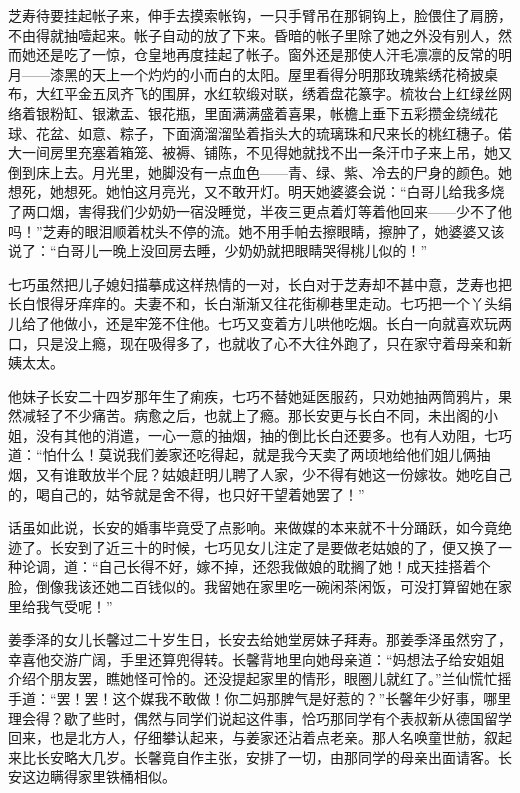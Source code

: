 \par 芝寿待要挂起帐子来，伸手去摸索帐钩，一只手臂吊在那铜钩上，脸偎住了肩膀，不由得就抽噎起来。帐子自动的放了下来。昏暗的帐子里除了她之外没有别人，然而她还是吃了一惊，仓皇地再度挂起了帐子。窗外还是那使人汗毛凛凛的反常的明月——漆黑的天上一个灼灼的小而白的太阳。屋里看得分明那玫瑰紫绣花椅披桌布，大红平金五凤齐飞的围屏，水红软缎对联，绣着盘花篆字。梳妆台上红绿丝网络着银粉缸、银漱盂、银花瓶，里面满满盛着喜果，帐檐上垂下五彩攒金绕绒花球、花盆、如意、粽子，下面滴溜溜坠着指头大的琉璃珠和尺来长的桃红穗子。偌大一间房里充塞着箱笼、被褥、铺陈，不见得她就找不出一条汗巾子来上吊，她又倒到床上去。月光里，她脚没有一点血色——青、绿、紫、冷去的尸身的颜色。她想死，她想死。她怕这月亮光，又不敢开灯。明天她婆婆会说：“白哥儿给我多烧了两口烟，害得我们少奶奶一宿没睡觉，半夜三更点着灯等着他回来——少不了他吗！”芝寿的眼泪顺着枕头不停的流。她不用手帕去擦眼睛，擦肿了，她婆婆又该说了：“白哥儿一晚上没回房去睡，少奶奶就把眼睛哭得桃儿似的！”
\par 七巧虽然把儿子媳妇描摹成这样热情的一对，长白对于芝寿却不甚中意，芝寿也把长白恨得牙痒痒的。夫妻不和，长白渐渐又往花街柳巷里走动。七巧把一个丫头绢儿给了他做小，还是牢笼不住他。七巧又变着方儿哄他吃烟。长白一向就喜欢玩两口，只是没上瘾，现在吸得多了，也就收了心不大往外跑了，只在家守着母亲和新姨太太。
\par 他妹子长安二十四岁那年生了痢疾，七巧不替她延医服药，只劝她抽两筒鸦片，果然减轻了不少痛苦。病愈之后，也就上了瘾。那长安更与长白不同，未出阁的小姐，没有其他的消遣，一心一意的抽烟，抽的倒比长白还要多。也有人劝阻，七巧道：“怕什么！莫说我们姜家还吃得起，就是我今天卖了两顷地给他们姐儿俩抽烟，又有谁敢放半个屁？姑娘赶明儿聘了人家，少不得有她这一份嫁妆。她吃自己的，喝自己的，姑爷就是舍不得，也只好干望着她罢了！”
\par 话虽如此说，长安的婚事毕竟受了点影响。来做媒的本来就不十分踊跃，如今竟绝迹了。长安到了近三十的时候，七巧见女儿注定了是要做老姑娘的了，便又换了一种论调，道：“自己长得不好，嫁不掉，还怨我做娘的耽搁了她！成天挂搭着个脸，倒像我该还她二百钱似的。我留她在家里吃一碗闲茶闲饭，可没打算留她在家里给我气受呢！”
\par 姜季泽的女儿长馨过二十岁生日，长安去给她堂房妹子拜寿。那姜季泽虽然穷了，幸喜他交游广阔，手里还算兜得转。长馨背地里向她母亲道：“妈想法子给安姐姐介绍个朋友罢，瞧她怪可怜的。还没提起家里的情形，眼圈儿就红了。”兰仙慌忙摇手道：“罢！罢！这个媒我不敢做！你二妈那脾气是好惹的？”长馨年少好事，哪里理会得？歇了些时，偶然与同学们说起这件事，恰巧那同学有个表叔新从德国留学回来，也是北方人，仔细攀认起来，与姜家还沾着点老亲。那人名唤童世舫，叙起来比长安略大几岁。长馨竟自作主张，安排了一切，由那同学的母亲出面请客。长安这边瞒得家里铁桶相似。
